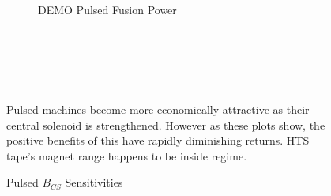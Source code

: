 \begin{figure*}
\begin{subfigure}[t]{0.45\textwidth}
        \centering
    \begin{adjustbox}{width=\textwidth}
      \Large
      
    \end{adjustbox}
        \caption{DEMO Pulsed Fusion Power}
    \end{subfigure}
    \hfill \hfill ~\\ ~\\ ~\\
    \caption{Pulsed $B_{CS}$ Sensitivities}
    \label{fig:pulsed_sensitivities} ~ \\
    \small{ Pulsed machines become more economically attractive as their central solenoid is strengthened. However as these plots show, the positive benefits of this have rapidly diminishing returns. HTS tape's magnet range happens to be inside regime. }
\end{figure*}


